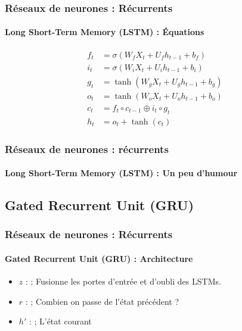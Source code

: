 \documentclass[xcolor=table]{beamer}
\begin{document}
\begin{frame}
	\frametitle{Réseaux de neurones : Récurrents}
	\framesubtitle{Long Short-Term Memory (LSTM) : \'Equations}
	\huge\vskip-24pt
	\begin{align*}
	f_t &= \sigma(W_f X_t + U_f h_{t-1} + b_f) \\
	i_t &= \sigma(W_i X_t + U_i h_{t-1} + b_i) \\
	g_t &= \tanh(W_g X_t + U_g h_{t-1} + b_g) \\
	o_t &= \tanh(W_o X_t + U_o h_{t-1} + b_o) \\
	c_t &= f_t \circ c_{t-1} \oplus i_t \circ g_t \\
	h_t &= o_t + \tanh(c_t)
	\end{align*}
	
	
	
\end{frame}

\begin{frame}
\frametitle{Réseaux de neurones : récurrents}
\framesubtitle{Long Short-Term Memory (LSTM) : Un peu d'humour}

\begin{center}
\end{center}

\end{frame}

\subsection{Gated Recurrent Unit (GRU)}

\begin{frame}
\frametitle{Réseaux de neurones : Récurrents}
\framesubtitle{Gated Recurrent Unit (GRU) : Architecture}
	
	\begin{minipage}{0.50\textwidth} 
		\begin{itemize}
			\item $z$ :  ; 
			Fusionne les portes d'entrée et d'oubli des LSTMs.
			\item $r$ :  ; 
			Combien on passe de l'état précédent ?
			\item $h'$ :  ;
			L'état courant	
		\end{itemize}
	\end{minipage}
	\begin{minipage}{0.49\textwidth}
	\end{minipage}
	

\end{frame}
\end{document}
